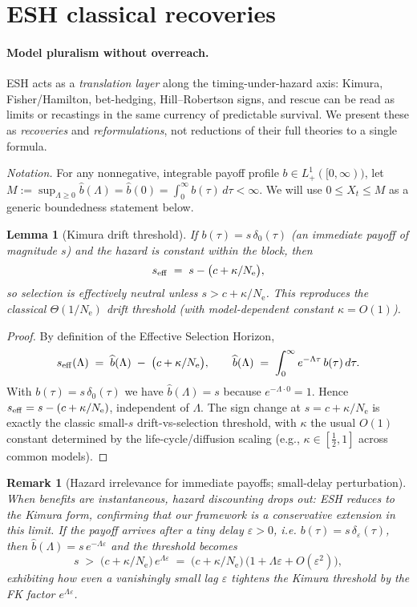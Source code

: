 \documentclass[11pt]{article}
\theoremstyle{upright}
\newtheorem{lemma}{Lemma}
\newtheorem{remark}{Remark}
\newcommand{\Ne}{N_{\mathrm{e}}}
\newcommand{\seff}[1][]{s_{\mathrm{eff}\if\relax\detokenize{#1}\relax\else,#1\fi}}
\begin{document}
\section{ESH classical recoveries}
\label{sec:unification}

\paragraph{Model pluralism without overreach.}
ESH acts as a \emph{translation layer} along the timing-under-hazard axis: Kimura, Fisher/Hamilton, bet-hedging, Hill–Robertson signs, and rescue can be read as limits or recastings in the same currency of predictable survival. We present these as \emph{recoveries} and \emph{reformulations}, not reductions of their full theories to a single formula.

\noindent\textit{Notation.} For any nonnegative, integrable payoff profile $b\in L^1_+([0,\infty))$,
let $M:=\sup_{\Lambda\ge 0}\widehat b(\Lambda)=\widehat b(0)=\int_0^\infty b(\tau)\,d\tau<\infty$.
We will use $0\le X_t\le M$ as a generic boundedness statement below.

\begin{lemma}[Kimura drift threshold]\label{lem:kimura}
If $b(\tau)=s\,\delta_0(\tau)$ (an immediate payoff of magnitude $s$) and the hazard is constant within the block, then
\[
\seff \;=\; s - \big(c+\kappa/\Ne\big),
\]
so selection is effectively neutral unless $s > c+\kappa/\Ne$. This reproduces the classical $\Theta(1/\Ne)$ drift threshold (with model-dependent constant $\kappa=O(1)$).
\end{lemma}

\begin{proof}
By definition of the Effective Selection Horizon,
\[
\seff(\Lambda)\;=\;\widehat b(\Lambda)\;-\;\big(c+\kappa/\Ne\big),
\qquad
\widehat b(\Lambda)\;=\;\int_0^\infty e^{-\Lambda\tau}\,b(\tau)\,d\tau.
\]
With $b(\tau)=s\,\delta_0(\tau)$ we have $\widehat b(\Lambda)=s$ because $e^{-\Lambda\cdot 0}=1$. Hence $\seff=s-(c+\kappa/\Ne)$, independent of $\Lambda$. The sign change at $s=c+\kappa/\Ne$ is exactly the classic small-$s$ drift-vs-selection threshold, with $\kappa$ the usual $O(1)$ constant determined by the life-cycle/diffusion scaling (e.g., $\kappa\in[\tfrac12,1]$ across common models).
\end{proof}

\begin{remark}[Hazard irrelevance for immediate payoffs; small-delay perturbation]
When benefits are instantaneous, hazard discounting drops out: ESH reduces to the Kimura form, confirming that our framework is a conservative extension in this limit. If the payoff arrives after a tiny delay $\varepsilon>0$, i.e. $b(\tau)=s\,\delta_\varepsilon(\tau)$, then $\widehat b(\Lambda)=s\,e^{-\Lambda\varepsilon}$ and the threshold becomes
\[
s \;>\; \big(c+\kappa/\Ne\big)\,e^{\Lambda\varepsilon}
\;=\; \big(c+\kappa/\Ne\big)\,\big(1+\Lambda\varepsilon+O(\varepsilon^2)\big),
\]
exhibiting how even a vanishingly small lag $\varepsilon$ tightens the Kimura threshold by the FK factor $e^{\Lambda\varepsilon}$.
\end{remark}
\end{document}
